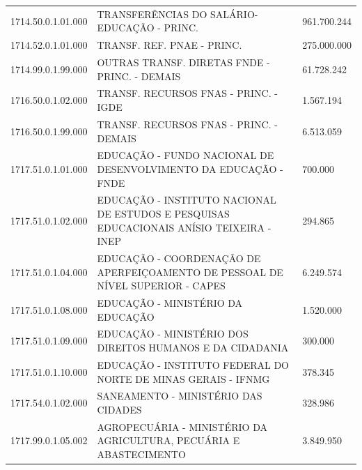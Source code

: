 \documentclass{article}
\begin{document}
\begin{longtable}[c]{m{2cm}|m{13cm}|m{2cm}}
\multicolumn{1}{C{2cm}|}{1714.50.0.1.01.000} & \multicolumn{1}{L{13cm}|}{TRANSFERÊNCIAS DO SALÁRIO-EDUCAÇÃO - PRINC.} & \multicolumn{1}{R{2cm}}{961.700.244} \\
\multicolumn{1}{C{2cm}|}{1714.52.0.1.01.000} & \multicolumn{1}{L{13cm}|}{TRANSF. REF. PNAE - PRINC.} & \multicolumn{1}{R{2cm}}{275.000.000} \\
\multicolumn{1}{C{2cm}|}{1714.99.0.1.99.000} & \multicolumn{1}{L{13cm}|}{OUTRAS TRANSF. DIRETAS FNDE - PRINC. - DEMAIS} & \multicolumn{1}{R{2cm}}{61.728.242} \\
\multicolumn{1}{C{2cm}|}{1716.50.0.1.02.000} & \multicolumn{1}{L{13cm}|}{TRANSF. RECURSOS FNAS - PRINC. - IGDE} & \multicolumn{1}{R{2cm}}{1.567.194} \\
\multicolumn{1}{C{2cm}|}{1716.50.0.1.99.000} & \multicolumn{1}{L{13cm}|}{TRANSF. RECURSOS FNAS - PRINC. - DEMAIS} & \multicolumn{1}{R{2cm}}{6.513.059} \\
\multicolumn{1}{C{2cm}|}{1717.51.0.1.01.000} & \multicolumn{1}{L{13cm}|}{EDUCAÇÃO - FUNDO NACIONAL DE DESENVOLVIMENTO DA EDUCAÇÃO - FNDE} & \multicolumn{1}{R{2cm}}{700.000} \\
\multicolumn{1}{C{2cm}|}{1717.51.0.1.02.000} & \multicolumn{1}{L{13cm}|}{EDUCAÇÃO - INSTITUTO NACIONAL DE ESTUDOS E PESQUISAS EDUCACIONAIS ANÍSIO TEIXEIRA - INEP} & \multicolumn{1}{R{2cm}}{294.865} \\
\multicolumn{1}{C{2cm}|}{1717.51.0.1.04.000} & \multicolumn{1}{L{13cm}|}{EDUCAÇÃO - COORDENAÇÃO DE APERFEIÇOAMENTO DE PESSOAL DE NÍVEL SUPERIOR - CAPES} & \multicolumn{1}{R{2cm}}{6.249.574} \\
\multicolumn{1}{C{2cm}|}{1717.51.0.1.08.000} & \multicolumn{1}{L{13cm}|}{EDUCAÇÃO - MINISTÉRIO DA EDUCAÇÃO} & \multicolumn{1}{R{2cm}}{1.520.000} \\
\multicolumn{1}{C{2cm}|}{1717.51.0.1.09.000} & \multicolumn{1}{L{13cm}|}{EDUCAÇÃO - MINISTÉRIO DOS DIREITOS HUMANOS E DA CIDADANIA} & \multicolumn{1}{R{2cm}}{300.000} \\
\multicolumn{1}{C{2cm}|}{1717.51.0.1.10.000} & \multicolumn{1}{L{13cm}|}{EDUCAÇÃO - INSTITUTO FEDERAL DO NORTE DE MINAS GERAIS - IFNMG} & \multicolumn{1}{R{2cm}}{378.345} \\
\multicolumn{1}{C{2cm}|}{1717.54.0.1.02.000} & \multicolumn{1}{L{13cm}|}{SANEAMENTO - MINISTÉRIO DAS CIDADES} & \multicolumn{1}{R{2cm}}{328.986} \\
\multicolumn{1}{C{2cm}|}{1717.99.0.1.05.002} & \multicolumn{1}{L{13cm}|}{AGROPECUÁRIA - MINISTÉRIO DA AGRICULTURA, PECUÁRIA E ABASTECIMENTO} & \multicolumn{1}{R{2cm}}{3.849.950} \\

\end{longtable}
\end{document}
